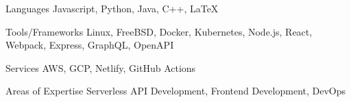 

\begin{cvskills}
  

  \cvskill
    {Languages} %
    {Javascript, Python, Java, C++, LaTeX} %

  \cvskill
    {Tools/Frameworks} %
    {Linux, FreeBSD, Docker, Kubernetes, Node.js, React, Webpack, Express, GraphQL, OpenAPI} %

  \cvskill
    {Services} %
    {AWS, GCP, Netlify, GitHub Actions} %

  \cvskill
    {Areas of Expertise} %
    {Serverless API Development, Frontend Development, DevOps} %








\end{cvskills}
